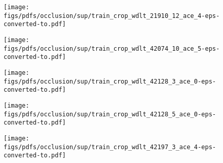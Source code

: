 \documentclass[runningheads]{llncs}
\begin{document}
\begin{figure*}[t!]
    \centering
    \begin{subfigure}[b]{0.16\linewidth}        \centering


        
    \end{subfigure}
    \begin{subfigure}[b]{0.16\linewidth}        \centering
        \texttt{[image: figs/pdfs/occlusion/sup/train\_crop\_wdlt\_21910\_12\_ace\_4-eps-converted-to.pdf]}
    \end{subfigure}
    \begin{subfigure}[b]{0.16\linewidth}        \centering
        \texttt{[image: figs/pdfs/occlusion/sup/train\_crop\_wdlt\_42074\_10\_ace\_5-eps-converted-to.pdf]}
    \end{subfigure}
    \begin{subfigure}[b]{0.16\linewidth}        \centering
        \texttt{[image: figs/pdfs/occlusion/sup/train\_crop\_wdlt\_42128\_3\_ace\_0-eps-converted-to.pdf]}
    \end{subfigure}
    \begin{subfigure}[b]{0.16\linewidth}        \centering
        \texttt{[image: figs/pdfs/occlusion/sup/train\_crop\_wdlt\_42128\_5\_ace\_0-eps-converted-to.pdf]}
    \end{subfigure}
    \begin{subfigure}[b]{0.16\linewidth}        \centering
        \texttt{[image: figs/pdfs/occlusion/sup/train\_crop\_wdlt\_42197\_3\_ace\_4-eps-converted-to.pdf]}
    \end{subfigure} \\ \vspace{1mm}
    
    
    \begin{subfigure}[b]{0.16\linewidth}        \centering


        

\end{subfigure}
\end{figure*}
\end{document}
